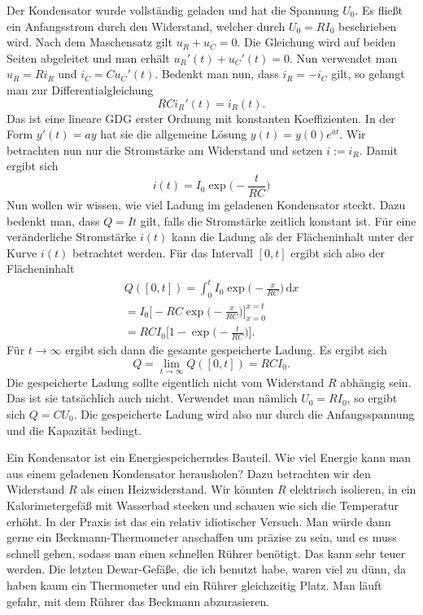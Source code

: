 \documentclass[a4paper,10pt,fleqn,twocolumn,twoside]{article}
\numberwithin{equation}{section}
\begin{document}
\noindent
Der Kondensator wurde vollständig geladen und hat die Spannung
$U_0$. Es fließt ein Anfangsstrom durch den Widerstand, welcher
durch $U_0=RI_0$ beschrieben wird. Nach dem Maschensatz
gilt $u_R+u_C=0$.
Die Gleichung wird auf beiden Seiten abgeleitet und man erhält
$u_R'(t)+u_C'(t)=0$. Nun verwendet man $u_R=Ri_R$ und $i_C=Cu_C'(t)$.
Bedenkt man nun, dass $i_R=-i_C$ gilt, so gelangt man zur
Differentialgleichung
\begin{equation}
RCi_R'(t) = i_R(t).
\end{equation}
Das ist eine lineare GDG erster Ordnung mit konstanten Koeffizienten.
In der Form $y'(t)=ay$ hat sie die allgemeine Lösung
$y(t)=y(0)e^{at}$. Wir betrachten nun nur die Stromstärke am
Widerstand und setzen $i:=i_R$. Damit ergibt sich
\begin{equation}\label{RCStrom}
i(t) = I_0\exp\Big(-\frac{t}{RC}\Big)
\end{equation}
Nun wollen wir wissen, wie viel Ladung im geladenen Kondensator
steckt. Dazu bedenkt man, dass $Q=It$ gilt, falls die Stromstärke
zeitlich konstant ist. Für eine veränderliche Stromstärke $i(t)$
kann die Ladung als der Flächeninhalt unter der Kurve $i(t)$
betrachtet werden. Für das Intervall $[0,t]$ ergibt sich also
der Flächeninhalt
\begin{gather*}
Q([0,t]) = \int_0^t I_0 \exp\Big(-\frac{x}{RC}\Big)\,\mathrm dx\\
= I_0\Big[-RC\exp\Big(-\frac{x}{RC}\Big)\Big]_{x=0}^{x=t}\\
= RC I_0 \Big[1-\exp\Big(-\frac{t}{RC}\Big)\Big].
\end{gather*}
Für $t\rightarrow\infty$ ergibt sich dann die gesamte gespeicherte
Ladung. Es ergibt sich
\begin{equation}
Q = \lim_{t\rightarrow\infty}Q([0,t]) = RCI_0.
\end{equation}
Die gespeicherte Ladung sollte eigentlich nicht vom Widerstand
$R$ abhängig sein. Das ist sie tatsächlich auch nicht. Verwendet
man nämlich $U_0=RI_0$, so ergibt sich $Q=CU_0$. Die gespeicherte
Ladung wird also nur durch die Anfangsspannung und die Kapazität
bedingt.

Ein Kondensator ist ein Energiespeicherndes Bauteil. Wie viel
Energie kann man aus einem geladenen Kondensator herausholen?
Dazu betrachten wir den Widerstand $R$ als einen Heizwiderstand.
Wir könnten $R$ elektrisch isolieren, in ein Kalorimetergefäß
mit Wasserbad stecken und schauen wie sich die Temperatur erhöht.
In der Praxis ist das ein relativ idiotischer Versuch. Man würde
dann gerne ein Beckmann-Thermometer anschaffen um präzise zu sein,
und es muss schnell gehen, sodass man einen schnellen Rührer
benötigt. Das kann sehr teuer werden. Die letzten Dewar-Gefäße,
die ich benutzt habe, waren viel zu dünn, da haben kaum ein
Thermometer und ein Rührer gleichzeitig Platz. Man läuft gefahr,
mit dem Rührer das Beckmann abzurasieren. 
\end{document}
